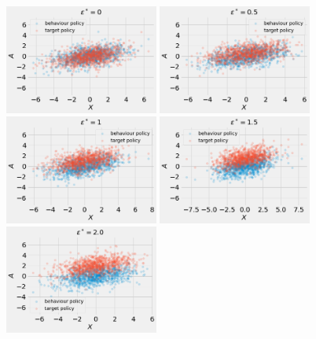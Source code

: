 \begin{figure}[t]
    \centering
    \includegraphics[width=0.45\textwidth, height=0.3\textwidth]{figures/copp/pol0.png}
    \includegraphics[width=0.45\textwidth, height=0.3\textwidth]{figures/copp/pol0.5.png}\\
    \includegraphics[width=0.45\textwidth, height=0.3\textwidth]{figures/copp/pol1.png}
    \includegraphics[width=0.45\textwidth, height=0.3\textwidth]{figures/copp/pol1.5.png}\\
    \includegraphics[width=0.45\textwidth, height=0.3\textwidth]{figures/copp/pol2.png}

\end{figure}
